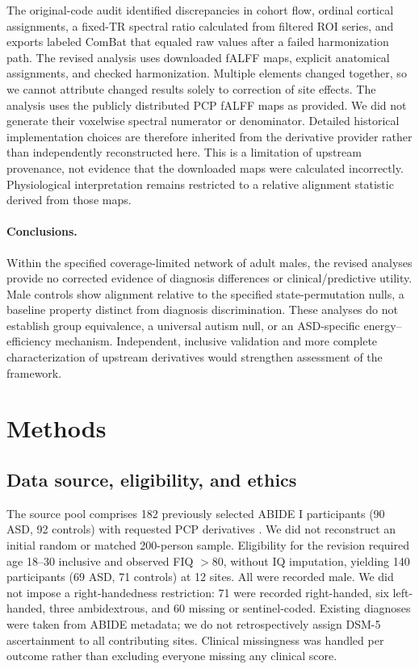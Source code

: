 \documentclass[10pt,letterpaper]{article}
\begin{document}
The original-code audit identified discrepancies in cohort flow, ordinal cortical
assignments, a fixed-TR spectral ratio calculated from filtered ROI series, and
exports labeled ComBat that equaled raw values after a failed harmonization path.
The revised analysis uses downloaded fALFF maps, explicit anatomical assignments,
and checked harmonization. Multiple elements changed together, so we cannot
attribute changed results solely to correction of site effects.
The analysis uses the publicly distributed PCP fALFF maps as provided. We did
not generate their voxelwise spectral numerator or denominator. Detailed
historical implementation choices are therefore inherited from the derivative
provider rather than independently reconstructed here. This is a limitation of
upstream provenance, not evidence that the downloaded maps were calculated
incorrectly. Physiological interpretation remains restricted to a relative
alignment statistic derived from those maps.

\paragraph*{Conclusions.}
Within the specified coverage-limited network of adult males, the revised analyses
provide no corrected evidence of diagnosis differences or clinical/predictive
utility. Male controls show alignment relative to the specified state-permutation
nulls, a baseline property distinct from diagnosis discrimination. These analyses
do not establish group equivalence, a universal autism null, or
an ASD-specific energy--efficiency mechanism. Independent, inclusive validation
and more complete characterization of upstream derivatives would strengthen
assessment of the framework.

\section*{Methods}
\subsection*{Data source, eligibility, and ethics}
The source pool comprises 182 previously selected ABIDE I participants (90 ASD,
92 controls) with requested PCP derivatives \cite{DiMartino:2014abide,PCPdocumentationRevision}.
We did not reconstruct an initial random or matched 200-person sample. Eligibility
for the revision required age 18--30 inclusive and observed FIQ $>80$, without IQ
imputation, yielding 140 participants (69 ASD, 71 controls) at 12 sites. All were
recorded male. We did not impose a right-handedness restriction: 71 were recorded
right-handed, six left-handed, three ambidextrous, and 60 missing or sentinel-coded.
Existing diagnoses were taken from ABIDE metadata; we do not retrospectively assign
DSM-5 ascertainment to all contributing sites. Clinical missingness was handled
per outcome rather than excluding everyone missing any clinical score.
\end{document}
